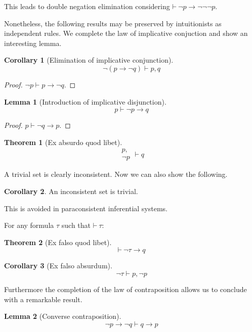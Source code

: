 \documentclass{amsbook}
\newcommand{\infers}{\mathrel\vdash}
\newcommand{\theorem}{\mathord\vdash\medspace}
\newcommand{\then}{\mathrel\rightarrow}
\theoremstyle{definition}
\newtheorem{thm}{Theorem}[section]
\newtheorem{lmm}{Lemma}[section]
\newtheorem{crl}{Corollary}[section]
\begin{document}
This leads to double negation elimination considering $\theorem \neg p \then \neg\neg\neg p$.

Nonetheless, the following results may be preserved by intuitionists as independent rules. We complete the law of implicative conjuction and show an interesting lemma.

\begin{crl}[Elimination of implicative conjunction]
    $$\neg(p \then \neg q) \infers p, q$$
    \begin{proof}
        $\neg p \infers p \then \neg q$.
    \end{proof}
\end{crl}

\begin{lmm}[Introduction of implicative disjunction]
    $$p \infers \neg p \then q$$
    \begin{proof}
        $p \infers \neg q \then p$.
    \end{proof}
\end{lmm}

\begin{thm}[Ex absurdo quod libet]
    $$\begin{aligned}
            p, \\ \neg p
        \end{aligned}\infers q$$
\end{thm}

A trivial set is clearly inconsistent. Now we can also show the following.

\begin{crl}
    An inconsistent set is trivial.
\end{crl}

This is avoided in paraconsistent inferential systems.

For any formula $\tau$ such that $\theorem \tau$:

\begin{thm}[Ex falso quod libet]
    $$\theorem \neg\tau \then q$$
\end{thm}

\begin{crl}[Ex falso absurdum]
    $$\neg\tau \infers p, \neg p$$
\end{crl}

Furthermore the completion of the law of contraposition allows us to conclude with a remarkable result.

\begin{lmm}[Converse contraposition]
    $$\neg p \then \neg q \infers q \then p$$
\end{lmm}
\end{document}
